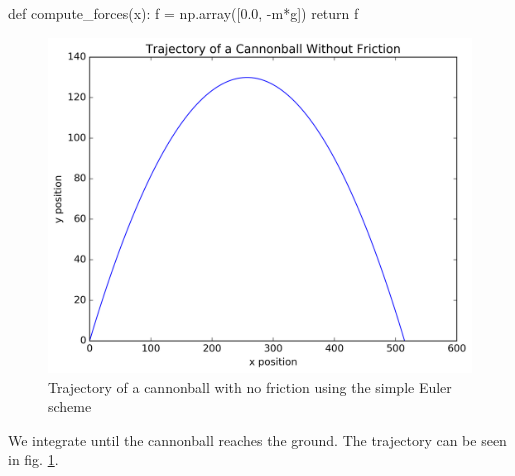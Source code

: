 \documentclass[a4paper,11pt,bibtotoc]{scrartcl}
\begin{document}
\begin{python}
def compute_forces(x):
    f = np.array([0.0, -m*g])
    return f
\end{python}

\begin{figure}[t]
  \includegraphics[width=0.7\linewidth]{../fig/cannonball1.png}
  \centering
  \caption{Trajectory of a cannonball with no friction using the simple Euler scheme}
  \label{fig:cannonball1}
\end{figure}

We integrate until the cannonball reaches the ground. The trajectory
can be seen in fig. \ref{fig:cannonball1}.
\end{document}

